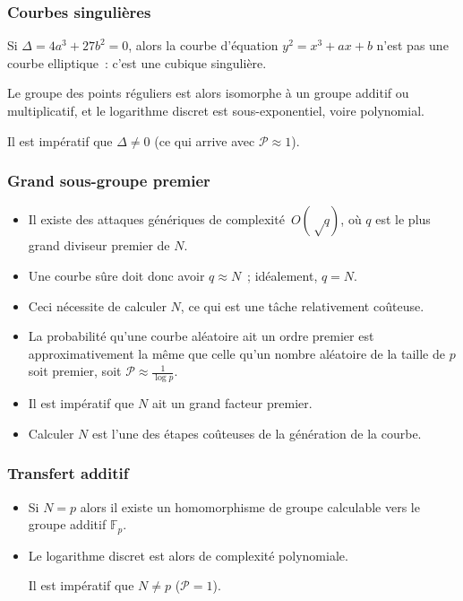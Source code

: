 \documentclass[francais]{beamer}
\newcommand{\F}{\mathbb{F}}
\newcommand{\prob}{\mathcal{P}}
\begin{document}
\begin{frame}\frametitle{Courbes singulières}

Si $Δ = 4 a^3 + 27 b^2 = 0$, alors
la courbe d'équation $y^2 = x^3 + a x + b$ n'est pas une courbe elliptique :
c'est une cubique singulière.

Le groupe des points réguliers est alors isomorphe à
un groupe additif ou multiplicatif,
et le logarithme discret est sous-exponentiel, voire polynomial.

\begin{block}{}
Il est impératif que $Δ ≠ 0$ (ce qui arrive avec $\prob ≈ 1$).
\end{block}
\end{frame}

\begin{frame}\frametitle{Grand sous-groupe premier}
\begin{itemize}
\item Il existe des attaques génériques de complexité~$O(√q)$,
où $q$ est le plus grand diviseur premier de $N$.
\item Une courbe sûre doit donc avoir $q ≈ N$ ; idéalement, $q = N$.
\item Ceci nécessite de calculer $N$,
ce qui est une tâche relativement coûteuse.
\item La probabilité qu'une courbe aléatoire ait un ordre premier
est approximativement la même que celle
qu'un nombre aléatoire de la taille de $p$ soit premier,
soit $\prob ≈ \frac{1}{\log p}$.
\end{itemize}
\begin{block}{}
\begin{itemize}
\item Il est impératif que $N$ ait un grand facteur premier.
\item Calculer $N$ est l'une des étapes coûteuses
de la génération de la courbe.
\end{itemize}
\end{block}
\end{frame}

\begin{frame}\frametitle{Transfert additif}
\begin{itemize}
\item Si $N = p$ alors il existe un homomorphisme de groupe calculable
vers le groupe additif $\F_p$.
\item Le logarithme discret est alors de complexité polynomiale.
\begin{block}{}
Il est impératif que $N ≠ p$ ($\prob = 1$).
\end{block}
\end{itemize}
\end{frame}
\end{document}

